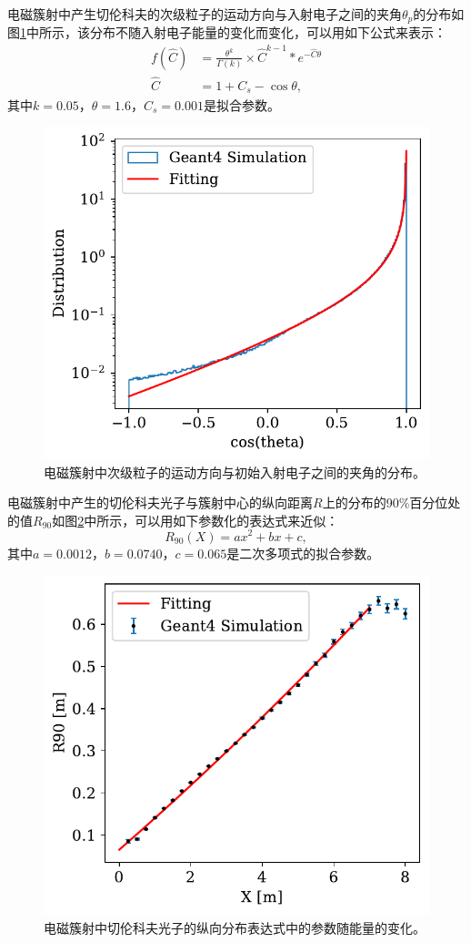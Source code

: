 电磁簇射中产生切伦科夫的次级粒子的运动方向与入射电子之间的夹角$\theta_p$的分布如图\ref{fig:param_costh_distribution}中所示，该分布不随入射电子能量的变化而变化，可以用如下公式来表示：
\begin{equation}
\begin{aligned}
  f(\hat{C}) &= \frac{\theta^k}{\Gamma(k)} \times \hat{C}^{k-1} * e^{-\hat{C} \theta}  \\
  \hat{C} &= 1 + C_s - \cos\theta ,
\end{aligned}
\end{equation}
其中$k=0.05$，$\theta=1.6$，$C_s=0.001$是拟合参数。

\begin{figure}[htb]
    \centering
    \includegraphics[width=0.6\linewidth]{img/param_costh_distribution.pdf}
    \caption{电磁簇射中次级粒子的运动方向与初始入射电子之间的夹角的分布。}
    \label{fig:param_costh_distribution}
\end{figure}

电磁簇射中产生的切伦科夫光子与簇射中心的纵向距离$R$上的分布的90\%百分位处的值$R_{90}$如图\ref{fig:param_r90}中所示，可以用如下参数化的表达式来近似：
\begin{equation}
    R_{90}(X) = ax^2 + bx + c ,
\end{equation}
其中$a=0.0012$，$b=0.0740$，$c=0.065$是二次多项式的拟合参数。

\begin{figure}[htb]
    \centering
    \includegraphics[width=0.6\linewidth]{img/param_r90.pdf}
    \caption{电磁簇射中切伦科夫光子的纵向分布表达式中的参数随能量的变化。}
    \label{fig:param_r90}
\end{figure}




% 
